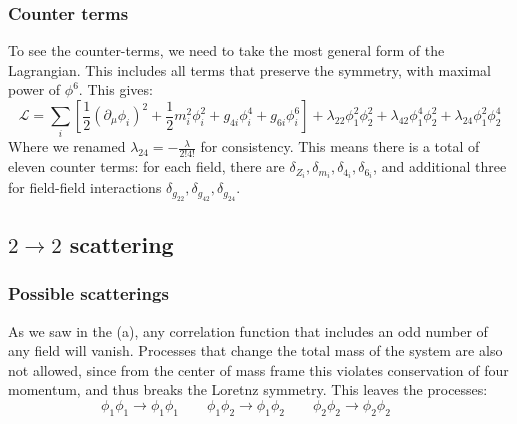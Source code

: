 \documentclass{article}
\begin{document}
\subsubsection*{Counter terms}
To see the counter-terms, we need to take the most general form of the Lagrangian. This includes all terms that preserve the symmetry, with maximal power of $\phi^6$. This gives:
\begin{equation}
    \mathcal{L} = \sum_i \left[\frac{1}{2}\left(\partial_\mu\phi_i\right)^2 + \frac{1}{2}m_i^2\phi_i^2 + g_{4i}\phi_i^4 + g_{6i}\phi_i^6\right] + \lambda_{22}\phi_1^2\phi_2^2 + \lambda_{42}\phi_1^4\phi_2^2 + \lambda_{24}\phi_1^2\phi_2^4
\end{equation}
Where we renamed $\lambda_{24} = -\frac{\lambda}{2!4!}$ for consistency. This means there is a total of eleven counter terms: for each field, there are $\delta_{Z_i}, \delta_{m_i}, \delta_{4_i}, \delta_{6_i}$, and additional three for field-field interactions $\delta_{g_{22}}, \delta_{g_{42}}, \delta_{g_{24}}$.
\subsection{$2\rightarrow2$ scattering}
\subsubsection{Possible scatterings}
As we saw in the (a), any correlation function that includes an odd number of any field will vanish. Processes that change the total mass of the system are also not allowed, since from the center of mass frame this violates conservation of four momentum, and thus breaks the Loretnz symmetry. This leaves the processes:
\begin{equation}
    \phi_1\phi_1 \rightarrow \phi_1\phi_1 \qquad
    \phi_1\phi_2 \rightarrow \phi_1\phi_2 \qquad
    \phi_2\phi_2 \rightarrow \phi_2\phi_2 \qquad
\end{equation}
\end{document}
